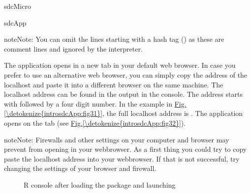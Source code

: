 \documentclass[letterpaper,10pt,english]{sphinxmanual}
\begin{document}
\def\sphinxLiteralBlockLabel{\label{\detokenize{introsdcApp:code1}}}
%
\begin{sphinxVerbatim}[commandchars=\\\{\},numbers=left,firstnumber=1,stepnumber=1]
sdcMicro

sdcApp
\end{sphinxVerbatim}

\begin{sphinxadmonition}{note}{Note:}
You can omit the lines starting with a hash tag (\sphinxcode{\sphinxupquote{\#}}) as these are comment lines
and ignored by the  interpreter.
\end{sphinxadmonition}

The application opens in a new tab in your default web browser. In case you prefer to use
an alternative web browser, you can simply copy the address of the localhost and paste it into
a different browser on the same machine. The localhost address can be
found in the output in the  console. The address starts with  followed
by a four digit number. In the example in \hyperref[\detokenize{introsdcApp:fig31}]{Fig.\@ \ref{\detokenize{introsdcApp:fig31}}}, the full localhost address is
. The application opens on the  tab (see \hyperref[\detokenize{introsdcApp:fig32}]{Fig.\@ \ref{\detokenize{introsdcApp:fig32}}}).

\begin{sphinxadmonition}{note}{Note:}
Firewalls and other settings on your computer and browser may prevent  from opening
in your webbrowser. As a first thing you could try to copy paste the localhost address
into your webbrowser. If that is not successful, try changing the settings of your
browser and firewall.
\end{sphinxadmonition}

\begin{figure}[htbp]
\centering
\capstart

\noindent{}
\caption{R console after loading the  package and launching }\label{\detokenize{introsdcApp:fig31}}\label{\detokenize{introsdcApp:id1}}\end{figure}
\end{document}
